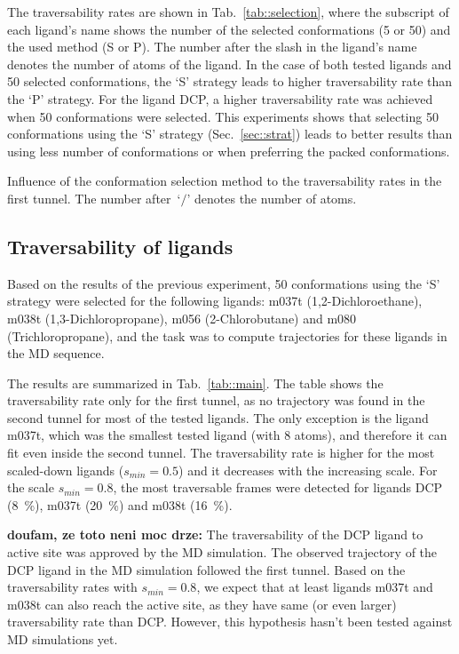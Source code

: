 \documentclass[usletter, 10pt, conference]{ieeeconf} %
\def\smin{s_{min}}
\begin{document}
The traversability rates are shown in Tab.~\ref{tab::selection}, where the subscript of each ligand's 
name shows the number of the selected conformations (5 or 50) and the used method (S or P).
The number after the slash in the ligand's name denotes the number of atoms of the ligand.
In the case of both tested ligands and 50 selected conformations, the `S' strategy leads to higher traversability rate than the `P' strategy.
For the ligand DCP, a higher traversability rate was achieved when 50 conformations were selected.
This experiments shows that selecting 50 conformations using the `S' strategy (Sec.~\ref{sec::strat}) leads to better results
than using less number of conformations or when preferring the packed conformations.

\begin{table}
\centering
\caption{\label{tab::selection}
    Influence of the conformation selection method to the traversability rates in the first tunnel.
    The number after~`$/$' denotes the number of atoms.
}
\small
\renewcommand{\tabcolsep}{4.3pt}
{\small

}
\end{table}





\subsection{Traversability of ligands}

Based on the results of the previous experiment, 50 conformations using the `S' strategy were selected for the following
ligands: m037t (1,2-Dichloroethane), m038t (1,3-Dichloropropane), m056 (2-Chlorobutane) and m080 (Trichloropropane), and
the task was to compute trajectories for these ligands in the MD sequence.

The results are summarized in Tab.~\ref{tab::main}.
The table shows the traversability rate only for the first tunnel, as no trajectory was found in the second tunnel for most of the tested ligands.
The only exception is the ligand m037t, which was the smallest tested ligand (with 8 atoms), and therefore it can fit even inside the second tunnel.
The traversability rate is higher for the most scaled-down ligands ($\smin=0.5$) and it decreases with the increasing scale.
For the scale $\smin=0.8$, the most traversable frames were detected for ligands DCP (8~\%), m037t (20~\%) and m038t (16~\%).

{\bf doufam, ze toto neni moc drze:}
The traversability of the DCP ligand to active site was approved by the MD simulation.
The observed trajectory of the DCP ligand in the MD simulation followed the first tunnel.
Based on the traversability rates with $\smin=0.8$, we expect that at least ligands m037t and m038t can also reach the active site, as
they have same (or even larger) traversability rate than DCP.
However, this hypothesis hasn't been tested against MD simulations yet.
\end{document}
